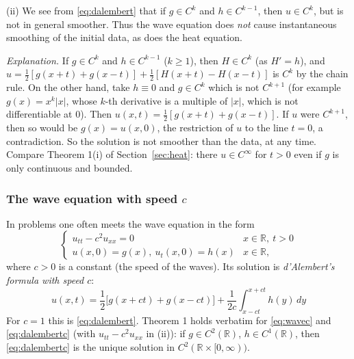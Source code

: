 \documentclass[11pt]{article}
\theoremstyle{plain}
\theoremstyle{definition}
\theoremstyle{remark}
\begin{document}
(ii) We see from \eqref{eq:dalembert} that if $g \in C^k$ and $h \in C^{k-1}$, then $u \in C^k$, but is not in general smoother. Thus the wave equation does \emph{not} cause instantaneous smoothing of the initial data, as does the heat equation.

\emph{Explanation.} If $g \in C^k$ and $h \in C^{k-1}$ ($k \geq 1$), then $H \in C^k$ (as $H' = h$), and $u = \frac12[g(x+t) + g(x-t)] + \frac12[H(x+t) - H(x-t)]$ is $C^k$ by the chain rule. On the other hand, take $h \equiv 0$ and $g \in C^k$ which is not $C^{k+1}$ (for example $g(x) = x^k|x|$, whose $k$-th derivative is a multiple of $|x|$, which is not differentiable at $0$). Then $u(x,t) = \frac12[g(x + t) + g(x - t)]$. If $u$ were $C^{k+1}$, then so would be $g(x) = u(x,0)$, the restriction of $u$ to the line $t = 0$, a contradiction. So the solution is not smoother than the data, at any time. Compare Theorem 1(i) of Section~\ref{sec:heat}: there $u \in C^\infty$ for $t > 0$ even if $g$ is only continuous and bounded.


\subsubsection{The wave equation with speed $c$}\label{sssec:wavec}

In problems one often meets the wave equation in the form
\begin{equation}\label{eq:wavec}
\begin{cases} u_{tt} - c^2u_{xx} = 0 & x \in \mathbb{R},\ t > 0 \\ u(x,0) = g(x),\ u_t(x,0) = h(x) & x \in \mathbb{R}, \end{cases}
\end{equation}
where $c > 0$ is a constant (the speed of the waves). Its solution is \emph{d'Alembert's formula with speed $c$}:
\begin{equation}\label{eq:dalembertc}
\boxed{\ u(x,t) = \frac12\big[g(x + ct) + g(x - ct)\big] + \frac{1}{2c}\int_{x-ct}^{x+ct} h(y)\, dy\ }
\end{equation}
For $c = 1$ this is \eqref{eq:dalembert}. Theorem 1 holds verbatim for \eqref{eq:wavec} and \eqref{eq:dalembertc} (with $u_{tt} - c^2u_{xx}$ in (ii)): if $g \in C^2(\mathbb{R})$, $h \in C^1(\mathbb{R})$, then \eqref{eq:dalembertc} is the unique solution in $C^2(\mathbb{R}\times[0,\infty))$.
\end{document}
